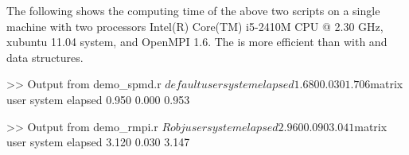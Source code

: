The following shows the computing time of the above two scripts
on a single machine with two processors
Intel(R) Core(TM) i5-2410M CPU @ 2.30 GHz, xubuntu 11.04 system,
and OpenMPI 1.6.
The  is more efficient than  with
 and  data structures.
\begin{CodeOutput}
>> Output from demo_spmd.r
$default
   user  system elapsed
  1.680   0.030   1.706

$matrix
   user  system elapsed
  0.950   0.000   0.953

>> Output from demo_rmpi.r
$Robj
   user  system elapsed
  2.960   0.090   3.041

$matrix
   user  system elapsed
  3.120   0.030   3.147
\end{CodeOutput}

